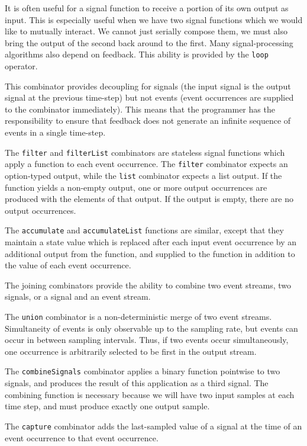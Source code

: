 It is often useful for a signal function to receive a portion of its
own output as input. This is especially useful when we have two
signal functions which we would like to mutually interact. We cannot
just serially compose them, we must also bring the output of the second
back around to the first. Many signal-processing algorithms also depend
on feedback. This ability is provided by the {\tt loop} operator. 

This combinator provides decoupling for signals
(the input signal is the output signal at the previous time-step)
but not events (event occurrences are supplied to the combinator immediately).
This means that the programmer has the responsibility to ensure that feedback
does not generate an infinite sequence of events in a single time-step.

The {\tt filter} and {\tt filterList} combinators are stateless signal functions
which apply a function to each event occurrence. The {\tt filter} combinator
expects an option-typed output, while the {\tt list} combinator expects a list
output. If the function yields a non-empty output, one or more output occurrences
are produced with the elements of that output. If the output is empty, there
are no output occurrences.

The {\tt accumulate} and {\tt accumulateList} functions are similar, except that
they maintain a state value which is replaced after each input event occurrence
by an additional output from the function, and supplied to the function in
addition to the value of each event occurrence.

The joining combinators provide the ability to combine two event
streams, two signals, or a signal and an event stream.

The {\tt union} combinator is a non-deterministic merge of two event streams.
Simultaneity of events is only observable up to the sampling rate, but events
can occur in between sampling intervals. Thus, if two events occur
simultaneously, one occurrence is arbitrarily selected to be first in the output
stream.

The {\tt combineSignals} combinator applies a binary function pointwise to two
signals, and produces the result of this application as a third signal. The
combining function is necessary because we will have two input samples at each
time step, and must produce exactly one output sample.

The {\tt capture} combinator adds the last-sampled value of a signal at the time
of an event occurrence to that event occurrence.

